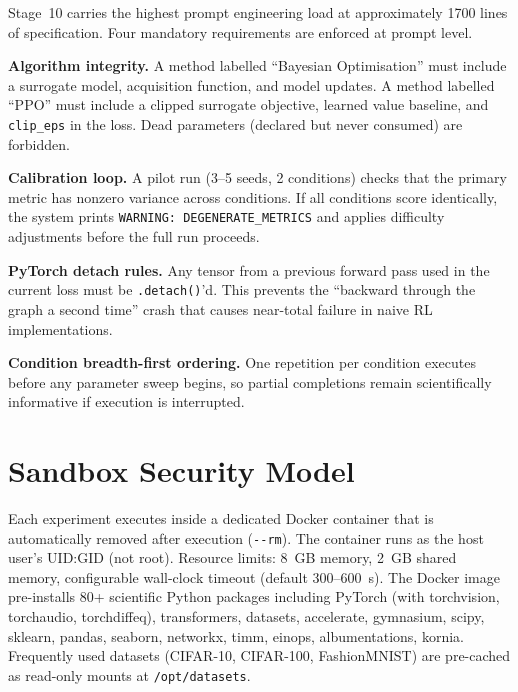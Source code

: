 \begin{tcolorbox}[
  title={Stage~10 Deep Dive: \textsc{Code\_Generation}},
  colback=blue!3!white,
  colframe=blue!50!black,
  fonttitle=\bfseries\small,
  breakable,
  label={box:stage10-prompt},
]
Stage~10 carries the highest prompt engineering load at approximately 1700 lines of specification.
Four mandatory requirements are enforced at prompt level.

\smallskip
\noindent\textbf{Algorithm integrity.}
A method labelled ``Bayesian Optimisation'' must include a surrogate model, acquisition function, and model updates.
A method labelled ``PPO'' must include a clipped surrogate objective, learned value baseline, and \texttt{clip\_eps} in the loss.
Dead parameters (declared but never consumed) are forbidden.

\smallskip
\noindent\textbf{Calibration loop.}
A pilot run (3--5 seeds, 2 conditions) checks that the primary metric has nonzero variance across conditions.
If all conditions score identically, the system prints \texttt{WARNING: DEGENERATE\_METRICS} and applies difficulty adjustments before the full run proceeds.

\smallskip
\noindent\textbf{PyTorch detach rules.}
Any tensor from a previous forward pass used in the current loss must be \texttt{.detach()}'d.
This prevents the ``backward through the graph a second time'' crash that causes near-total failure in naive RL implementations.

\smallskip
\noindent\textbf{Condition breadth-first ordering.}
One repetition per condition executes before any parameter sweep begins, so partial completions remain scientifically informative if execution is interrupted.
\end{tcolorbox}

\section{Sandbox Security Model}
\label{app:sandbox}

Each experiment executes inside a dedicated Docker container that is automatically removed after execution (\texttt{-{}-rm}). The container runs as the host user's UID:GID (not root). Resource limits: 8~GB memory, 2~GB shared memory, configurable wall-clock timeout (default 300--600~s). The Docker image pre-installs 80+ scientific Python packages including PyTorch (with torchvision, torchaudio, torchdiffeq), transformers, datasets, accelerate, gymnasium, scipy, sklearn, pandas, seaborn, networkx, timm, einops, albumentations, kornia. Frequently used datasets (CIFAR-10, CIFAR-100, FashionMNIST) are pre-cached as read-only mounts at \texttt{/opt/datasets}.

